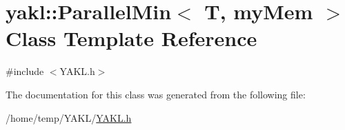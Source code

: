 \hypertarget{classyakl_1_1ParallelMin}{}\section{yakl\+:\+:Parallel\+Min$<$ T, my\+Mem $>$ Class Template Reference}
\label{classyakl_1_1ParallelMin}


{\ttfamily \#include $<$Y\+A\+K\+L.\+h$>$}



The documentation for this class was generated from the following file\+:\begin{DoxyCompactItemize}
\item 
/home/temp/\+Y\+A\+K\+L/\hyperlink{YAKL_8h}{Y\+A\+K\+L.\+h}\end{DoxyCompactItemize}
